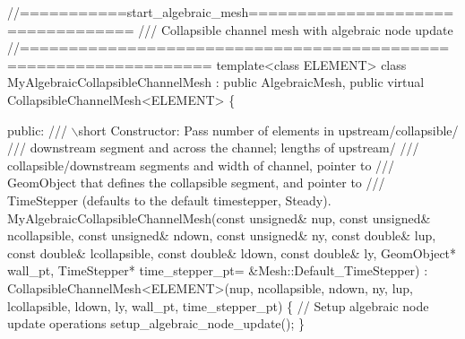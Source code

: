  
\begin{DoxyCodeInclude}
\textcolor{comment}{//===========start\_algebraic\_mesh==================================}
\textcolor{comment}{/// Collapsible channel mesh with algebraic node update}
\textcolor{comment}{}\textcolor{comment}{//=================================================================}
\textcolor{keyword}{template}<\textcolor{keyword}{class} ELEMENT>
\textcolor{keyword}{class }MyAlgebraicCollapsibleChannelMesh : 
  \textcolor{keyword}{public} AlgebraicMesh,
  \textcolor{keyword}{public} \textcolor{keyword}{virtual} CollapsibleChannelMesh<ELEMENT>
\{ 

\textcolor{keyword}{public}: 
\textcolor{comment}{}
\textcolor{comment}{ /// \(\backslash\)short Constructor: Pass number of elements in upstream/collapsible/}
\textcolor{comment}{ /// downstream segment and across the channel; lengths of upstream/}
\textcolor{comment}{ /// collapsible/downstream segments and width of channel, pointer to }
\textcolor{comment}{ /// GeomObject that defines the collapsible segment, and pointer to }
\textcolor{comment}{ /// TimeStepper (defaults to the default timestepper, Steady). }
\textcolor{comment}{} MyAlgebraicCollapsibleChannelMesh(\textcolor{keyword}{const} \textcolor{keywordtype}{unsigned}& nup, 
                                   \textcolor{keyword}{const} \textcolor{keywordtype}{unsigned}& ncollapsible, 
                                   \textcolor{keyword}{const} \textcolor{keywordtype}{unsigned}& ndown, 
                                   \textcolor{keyword}{const} \textcolor{keywordtype}{unsigned}& ny, 
                                   \textcolor{keyword}{const} \textcolor{keywordtype}{double}& lup, 
                                   \textcolor{keyword}{const} \textcolor{keywordtype}{double}& lcollapsible, 
                                   \textcolor{keyword}{const} \textcolor{keywordtype}{double}& ldown, 
                                   \textcolor{keyword}{const} \textcolor{keywordtype}{double}& ly,
                                   GeomObject* wall\_pt,
                                   TimeStepper* time\_stepper\_pt=
                                   &Mesh::Default\_TimeStepper) :
  CollapsibleChannelMesh<ELEMENT>(nup, ncollapsible, ndown, ny,
                                  lup, lcollapsible, ldown, ly,
                                  wall\_pt,
                                  time\_stepper\_pt)
  \{
   \textcolor{comment}{// Setup algebraic node update operations}
   setup\_algebraic\_node\_update();
  \}

\end{DoxyCodeInclude}


